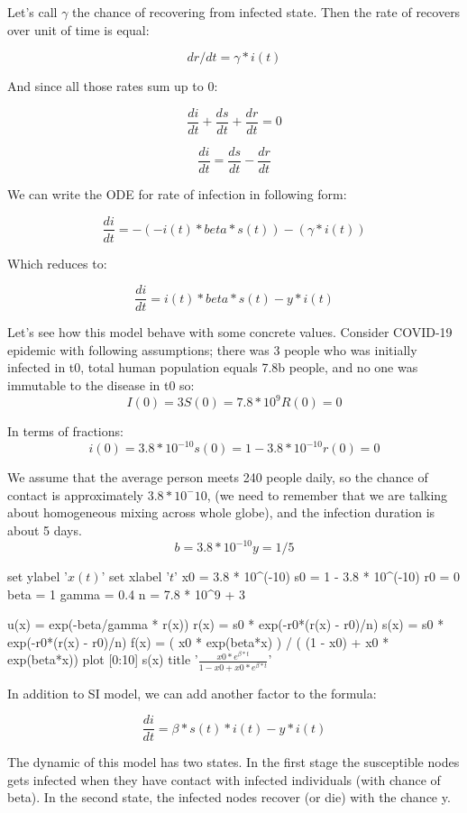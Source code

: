 \documentclass[nostrict]{szablonPG}
\begin{document}
Let's call $\gamma$ the chance of recovering from infected state. Then the rate of recovers over unit of time is equal:

\[dr/dt = \gamma * i(t)\]

And since all those rates sum up to 0:

\[\frac{di}{dt} + \frac{ds}{dt} + \frac{dr}{dt} = 0\]

\[\frac{di}{dt} = \frac{ds}{dt} - \frac{dr}{dt}\]

We can write the ODE for rate of infection in following form:

\[\frac{di}{dt} = -(- i(t) * beta * s(t)) - (\gamma * i(t))\]

Which reduces to:

\[\frac{di}{dt} = i(t) * beta * s(t) - y * i(t)\]


Let's see how this model behave with some concrete values.  Consider COVID-19 epidemic with following assumptions; there was 3 people who was initially infected in t0, total human population equals 7.8b people, and no one was immutable to the disease in t0 so:
\[
I(0) = 3
S(0) = 7.8 * 10^9
R(0) = 0
\]

In terms of fractions:
\[
i(0) =  3.8 * 10^{-10}
s(0) = 1 - 3.8 * 10^{-10}
r(0) = 0
\]

We assume that the average person meets 240 people daily, so the chance of contact is approximately $3.8 * 10^-10$, (we need to remember that we are talking about homogeneous mixing across whole globe), and the infection duration is about 5 days. 
\[
b = 3.8 * 10^{-10}
y = 1/5
\]

\begin{gnuplot}[scale=0.8]
	set ylabel '$x(t)$'
	set xlabel '$t$'
	x0 = 3.8 * 10^(-10)
	s0 = 1 - 3.8 * 10^(-10)
	r0 = 0
	beta = 1
	gamma = 0.4
	n = 7.8 * 10^9 + 3
	
	u(x) = exp(-beta/gamma * r(x))
	r(x) = s0 * exp(-r0*(r(x) - r0)/n) 
	s(x) = s0 * exp(-r0*(r(x) - r0)/n) 
	f(x) = ( x0 * exp(beta*x) ) / ( (1 - x0) + x0 * exp(beta*x))
	plot [0:10] s(x) title '$\frac{x0 * e^{\beta*t}}{1 - x0 + x0 * e^{\beta*t}}$'
\end{gnuplot}
 

In addition to SI model, we can add another factor to the formula:

\[\frac{di}{dt} = \beta * s(t) * i(t) - y * i(t)\]

The dynamic of this model has two states. In the first stage the susceptible nodes gets infected  when they have contact with infected individuals (with chance of beta). In the second state, the infected nodes recover (or die) with the chance y. 
\end{document}
